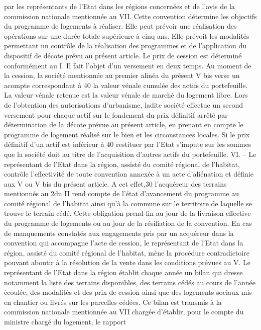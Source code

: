 \documentclass[11pt,a4paper]{report}
\begin{document}
	par les représentants de l'Etat dans les régions concernées et de l'avis de la commission nationale mentionnée
	au VII. Cette convention détermine les objectifs du programme de logements à réaliser. Elle peut prévoir une
	réalisation des opérations sur une durée totale supérieure à cinq ans. Elle prévoit les modalités permettant un
	contrôle de la réalisation des programmes et de l'application du dispositif de décote prévu au présent article.
	Le prix de cession est déterminé conformément au I. Il fait l'objet d'un versement en deux temps. Au moment de
	la cession, la société mentionnée au premier alinéa du présent V bis verse un acompte correspondant à 40 %
	la valeur vénale cumulée des actifs du portefeuille. La valeur vénale retenue est la valeur vénale de marché du
	logement libre. Lors de l'obtention des autorisations d'urbanisme, ladite société effectue un second versement
	pour chaque actif sur le fondement du prix définitif arrêté par détermination de la décote prévue au présent
	article, en prenant en compte le programme de logement réalisé sur le bien et les circonstances locales. Si le
	prix définitif d'un actif est inférieur à 40 %
	restituer par l'Etat s'impute sur les sommes que la société doit au titre de l'acquisition d'autres actifs du
	portefeuille.
	VI. – Le représentant de l'Etat dans la région, assisté du comité régional de l'habitat, contrôle l'effectivité de
	toute convention annexée à un acte d'aliénation et définie aux V ou V bis du présent article. A cet effet,30
	l'acquéreur des terrains mentionnés au 2\degre  du II rend compte de l'état d'avancement du programme au comité
	régional de l'habitat ainsi qu'à la commune sur le territoire de laquelle se trouve le terrain cédé. Cette
	obligation prend fin au jour de la livraison effective du programme de logements ou au jour de la résiliation de
	la convention.
	En cas de manquements constatés aux engagements pris par un acquéreur dans la convention qui accompagne
	l'acte de cession, le représentant de l'Etat dans la région, assisté du comité régional de l'habitat, mène la
	procédure contradictoire pouvant aboutir à la résolution de la vente dans les conditions prévues au V.
	Le représentant de l'Etat dans la région établit chaque année un bilan qui dresse notamment la liste des terrains
	disponibles, des terrains cédés au cours de l'année écoulée, des modalités et des prix de cession ainsi que des
	logements sociaux mis en chantier ou livrés sur les parcelles cédées. Ce bilan est transmis à la commission
	nationale mentionnée au VII chargée d'établir, pour le compte du ministre chargé du logement, le rapport
\end{document}
